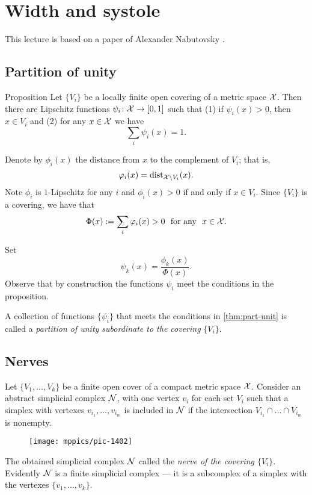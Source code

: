 \chapter{Width and systole}

This lecture is based on a paper of Alexander Nabutovsky \cite{nabutovsky}.

\section{Partition of unity}

\begin{thm}{Proposition}\label{thm:part-unit}
 Let $\{V_i\}$ be a locally finite open covering of a metric space ${\mathcal{X}}$.
Then there are Lipschitz functions $\psi_i\:{\spc{X}}\z\to[0,1]$ such that (1) if $\psi_i(x)>0$, then $x\in V_i$ and (2) for any $x\in {\mathcal{X}}$ we have
$$\sum_i\psi_i(x)=1.$$

\end{thm}

Denote by $\phi_i(x)$ the distance from $x$ to the complement of $V_i$;
that is,
$$\varphi_i(x)=\mathrm{dist}_{{\mathcal{X}}\backslash V_i}(x).$$
Note $\phi_i$ is $1$-Lipschitz
for any $i$
and $\phi_i(x)>0$ if and only if $x\in V_i$.
Since $\{V_i\}$ is a covering, we have that
$$\Phi(x)\df\sum_i\phi_i(x)>0\ \ \text{for any}\ \ x\in {\spc{X}}.$$

Set 
$$\psi_k(x)=\frac{\phi_k(x)}{\Phi(x)}.$$
Observe that by construction the functions $\psi_i$ meet the conditions in the proposition.
\qedsf

A collection of functions $\{\psi_i\}$ that meets the conditions in \ref{thm:part-unit} is called 
a \emph{partition of unity subordinate to the covering} $\{V_i\}$.

\section{Nerves}

Let $\{V_1,\dots,V_k\}$ be a finite open cover of a compact metric space $\mathcal{X}$.
Consider an abstract simplicial complex $\mathcal{N}$, with one vertex $v_i$ for each set $V_i$ such that a simplex with vertexes $v_{i_1},\dots, v_{i_m}$ is included in $\mathcal{N}$ if 
the intersection $V_{i_1}\cap\dots\cap V_{i_m}$ is nonempty.
\begin{figure}[h!]
\vskip-0mm
\centering
\texttt{[image: mppics/pic-1402]}
\end{figure}
The obtained simplicial complex $\mathcal{N}$ called the \emph{nerve of the covering $\{V_i\}$}.
Evidently $\mathcal{N}$ is a finite simplicial complex ---
it is a subcomplex of a simplex with the vertexes $\{v_1,\dots,v_k\}$.


